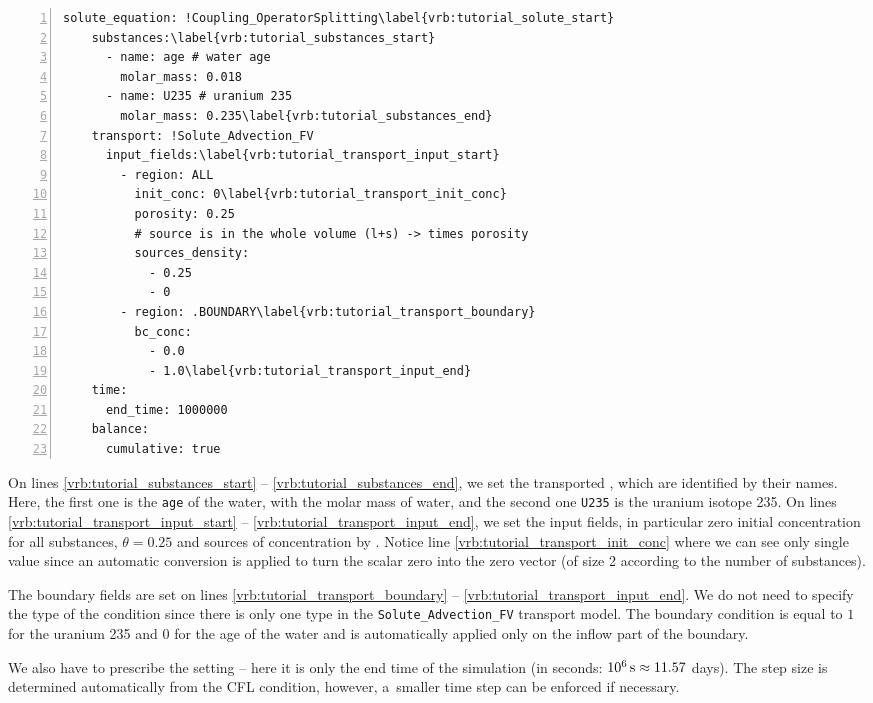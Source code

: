 \begin{Verbatim}[numbers=left, firstnumber=last,commandchars=\\\{\}]
  solute_equation: !Coupling_OperatorSplitting\label{vrb:tutorial_solute_start}
    substances:\label{vrb:tutorial_substances_start}
      - name: age # water age
        molar_mass: 0.018
      - name: U235 # uranium 235
        molar_mass: 0.235\label{vrb:tutorial_substances_end}
    transport: !Solute_Advection_FV
      input_fields:\label{vrb:tutorial_transport_input_start}
        - region: ALL
          init_conc: 0\label{vrb:tutorial_transport_init_conc}
          porosity: 0.25
          # source is in the whole volume (l+s) -> times porosity
          sources_density:
            - 0.25
            - 0
        - region: .BOUNDARY\label{vrb:tutorial_transport_boundary}
          bc_conc:
            - 0.0
            - 1.0\label{vrb:tutorial_transport_input_end}
    time:
      end_time: 1000000
    balance:
      cumulative: true
\end{Verbatim}

On lines \ref{vrb:tutorial_substances_start} -- \ref{vrb:tutorial_substances_end}, we set the transported , 
which are identified by their names. Here, the first one is the \verb'age' of the water, with the molar mass of water, 
and the second one \verb'U235' is the uranium isotope 235. 
On lines \ref{vrb:tutorial_transport_input_start} -- \ref{vrb:tutorial_transport_input_end}, we set the input fields, in particular zero initial concentration for all substances,
 $\theta = 0.25$ and 
sources of concentration by . 
Notice line \ref{vrb:tutorial_transport_init_conc} where we can see only single value since an automatic conversion is applied to turn the scalar 
zero into the zero vector (of size 2 according to the number of substances). 

The boundary fields are set on lines \ref{vrb:tutorial_transport_boundary} -- \ref{vrb:tutorial_transport_input_end}. We do not need to specify the type of the condition since there is 
only one type in the {\tt Solute\_Advection\_FV} transport model. The boundary condition is equal to $1$ for the uranium 235 and $0$ 
for the age of the water and is automatically applied only on the inflow part of the boundary. 

We also have to prescribe the  setting -- here it is only the end time of the simulation
(in seconds: $10^6\,\rm{s}\approx 11.57$ days). The step size is determined automatically from the CFL condition,
however, a~smaller time step can be enforced if necessary.

